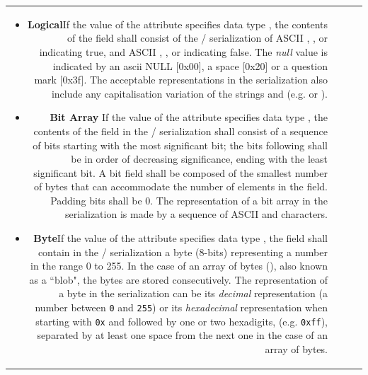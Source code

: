 \begin{tabular}{RRCp{0.8\textwidth}}
\begin{center}
{\begin{itemize}
\item {\bf Logical}\quad If the value of the {}
attribute specifies data type {},
the contents of the field{ }shall consist of the / serialization of
ASCII , ,  or  indicating true, and
ASCII , , or  indicating false.
The {\em null} value is indicated by an ascii NULL [0x00],
a space [0x20]
or a question mark  [0x3f].
The acceptable representations in the  serialization
also include any capitalisation variation of the 
strings   and  (e.g.  or ).

\item {\bf Bit Array} \quad If the value of the {}
attribute specifies data type {},
the contents of the field{ }in the / serialization shall consist of
a sequence of bits starting with the most significant bit; the bits
following shall be in order of decreasing significance, ending with
the least significant bit. A bit field shall be composed of the
smallest number of bytes that can accommodate the number of elements
in the field. Padding bits shall be 0.
The representation of a bit array in the  serialization
is made by a sequence of ASCII  and  characters.

\item {\bf Byte}\quad If the value of the {}
attribute specifies data type {},
the field shall contain in the / serialization a byte 
(8-bits) representing a number in the
range 0 to 255. 
In the case of an array of bytes (),
also known as a ``blob", the bytes are stored consecutively.
The representation of a byte in the  serialization
can be its {\em decimal} representation (a number between {\tt0} and {\tt255})
or its {\em hexadecimal} representation when starting with {\tt0x} and 
followed by one or two hexadigits,
(e.g. {\tt0xff}), separated by at least one space from the next one
in the case of an array of bytes.


\end{itemize}}
\end{center}
\end{tabular}
